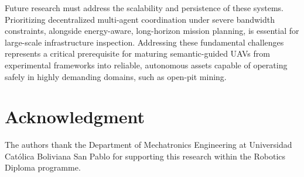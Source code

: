 \documentclass[conference]{IEEEtran}
\begin{document}
Future research must address the scalability and persistence of these systems. Prioritizing decentralized multi-agent coordination under severe bandwidth constraints, alongside energy-aware, long-horizon mission planning, is essential for large-scale infrastructure inspection. Addressing these fundamental challenges represents a critical prerequisite for maturing semantic-guided UAVs from experimental frameworks into reliable, autonomous assets capable of operating safely in highly demanding domains, such as open-pit mining.
\section*{Acknowledgment}
The authors thank the Department of Mechatronics Engineering at Universidad Cat\'{o}lica Boliviana San Pablo for supporting this research within the Robotics Diploma programme.


\end{document}
